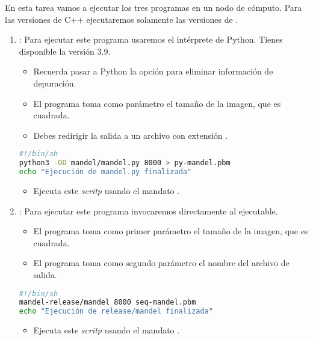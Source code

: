 En esta tarea vamos a ejecutar los tres programas en un nodo de cómputo.
Para las versiones de C++ ejecutaremos solamente las versiones de .

\begin{enumerate}
  \item {}: Para ejecutar este programa usaremos el intérprete de Python.
        Tienes disponible la versión 3.9.

    \begin{itemize}
      \item Recuerda pasar a Python la opción  para eliminar información
            de depuración.
      \item El programa toma como parámetro el tamaño de la imagen, que es cuadrada.
      \item Debes redirigir la salida a un archivo con extensión .
    \end{itemize}

\begin{lstlisting}[language=bash,title={Archivo: runpy.sh},frame=single]
#!/bin/sh
python3 -OO mandel/mandel.py 8000 > py-mandel.pbm
echo "Ejecución de mandel.py finalizada"
\end{lstlisting}

    \begin{itemize}
      \item Ejecuta este \emph{scritp} usando el mandato .
    \end{itemize}

  \item {}: Para ejecutar este programa invocaremos directamente al
        ejecutable.
    \begin{itemize}
      \item El programa toma como primer parámetro el tamaño de la imagen, que es cuadrada.
      \item El programa toma como segundo parámetro el nombre del archivo de salida.
    \end{itemize}

\begin{lstlisting}[language=bash,title={Archivo: run-seq-mandel.sh},frame=single]
#!/bin/sh
mandel-release/mandel 8000 seq-mandel.pbm
echo "Ejecución de release/mandel finalizada"
\end{lstlisting}
    \begin{itemize}
      \item Ejecuta este \emph{scritp} usando el mandato .
    \end{itemize}


\end{enumerate}
